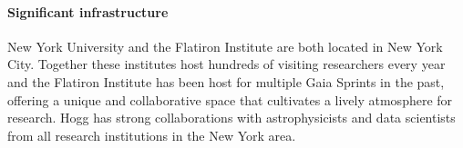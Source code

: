 \paragraph{Significant infrastructure}
New York University and the Flatiron Institute are both located in New York City. Together these institutes host hundreds of visiting researchers every year and the Flatiron Institute has been host for multiple Gaia Sprints in the past, offering a unique and collaborative space that cultivates a lively atmosphere for research.
Hogg has strong collaborations with astrophysicists and data scientists from all research institutions in the New York area.
